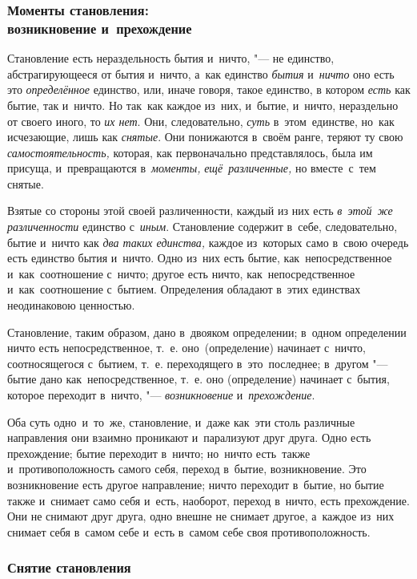 \subsubsection[Моменты становления: возникновение и~прехождение]%
{Моменты становления:\nopagebreak\\возникновение и~прехождение}

Становление есть нераздельность бытия и~ничто, "--- не единство,
абстрагирующееся от бытия и~ничто, а~как единство {\em бытия} и~{\em ничто} оно
есть это {\em определённое} единство, или, иначе говоря, такое единство, в
котором {\em есть} как бытие, так и~ничто. Но так~как каждое из~них, и~бытие,
и~ничто, нераздельно от своего иного, то {\em их нет}. Они, следовательно,
{\em суть} в~этом~единстве, но~как исчезающие, лишь как {\em снятые}. Они
понижаются в~своём ранге, теряют ту свою {\em самостоятельность,} которая, как
первоначально представлялось, была им присуща, и~превращаются в~{\em моменты,}
{\em ещё~различенные,} но вместе~с~тем снятые.

Взятые со стороны этой своей различенности, каждый из них есть
{\em в~этой~же различенности} единство с~{\em иным}. Становление содержит
в~себе, следовательно, бытие и~ничто как {\em два таких единства,} каждое из~которых
само в~свою очередь есть единство бытия и~ничто. Одно из~них есть бытие,
как~непосредственное и~как~соотношение с~ничто; другое есть ничто,
как~непосредственное и~как~соотношение с~бытием. Определения обладают в~этих
единствах неодинаковою ценностью.

Становление, таким образом, дано в~двояком определении; в~одном определении
ничто есть непосредственное, т.~е. оно~(определение) начинает с~ничто,
соотносящегося с~бытием, т.~е. переходящего в~это~последнее; в~другом "---
бытие дано как~непосредственное, т.~е. оно (определение) начинает с~бытия,
которое переходит в~ничто, "--- {\em возникновение} и~{\em прехождение}.

Оба суть одно~и~то~же, становление, и~даже как~эти столь различные направления
они взаимно проникают и~парализуют друг друга. Одно есть прехождение; бытие
переходит в~ничто; но~ничто есть~также и~противоположность самого себя, переход
в~бытие, возникновение. Это возникновение есть другое направление; ничто
переходит в~бытие, но бытие также и~снимает само себя и~есть, наоборот, переход
в~ничто, есть прехождение. Они не снимают друг друга, одно внешне не снимает
другое, а~каждое из~них снимает себя в~самом себе и~есть в~самом себе своя
противоположность.

\subsubsection{Снятие становления}

